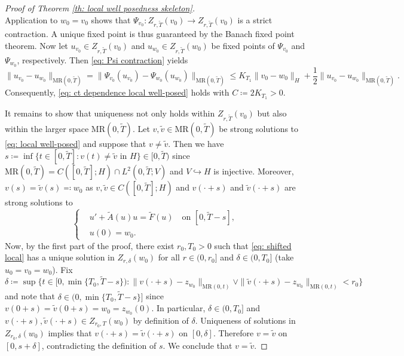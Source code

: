 \documentclass{amsart}
\renewcommand{\MR}{\mathrm{MR}}
\newcommand{\<}{\langle}
\newcommand{\?}{\rangle}
\newcommand{\into}{\hookrightarrow}
\theoremstyle{plain}
\theoremstyle{remark}
\theoremstyle{plain}
\numberwithin{equation}{section}
\begin{document}
\begin{proof}[Proof of Theorem \ref{th: local well posedness skeleton}]
\begin{equation}
\end{equation} 
Application to $w_0=v_0$ shows that $\Psi_{v_0}\colon Z_{r,\tilde{T}}(v_0)\to Z_{r,\tilde{T}}(v_0)$ is a strict contraction. A unique fixed point is thus guaranteed by the Banach fixed point theorem.
Now let $u_{v_0}\in Z_{r,\tilde{T}}(v_0)$ and $u_{w_0}\in Z_{r,\tilde{T}}(w_0)$ be fixed points of $\Psi_{v_0}$ and $\Psi_{w_0}$, respectively. Then \eqref{eq: Psi contraction} yields
\[
\|u_{v_0}-u_{w_0}\|_{\MR(0,\tilde{T})}=\|\Psi_{v_0}(u_{v_0})-\Psi_{w_0}(u_{w_0})\|_{\MR(0,\tilde{T})}\leq K_{T_1}\|v_0-w_0\|_H+\frac{1}{2}\|u_{v_0}-u_{w_0}\|_{\MR(0,\tilde{T})}.
\]
Consequently, \eqref{eq: ct dependence local well-posed} holds with $C\coloneqq 2K_{T_1}>0$.

It remains to show that uniqueness not only holds within $Z_{r,\tilde{T}}(v_0)$ but also within the larger space $\MR(0,\tilde{T})$.
Let $v,\tilde{v}\in \MR(0,\tilde{T})$ be strong solutions to \eqref{eq: local well-posed} and suppose that $v\neq \tilde{v}$. Then we have $s\coloneqq \inf\{t\in[0,\tilde{T}]:v(t)\neq \tilde{v} \text{ in } H\} \in[0,\tilde{T})$ since $\MR(0,\tilde{T})=C([0,\tilde{T}];H)\cap L^2(0,\tilde{T};V)$ and $V\into H$ is injective.  Moreover, $v(s)=\tilde{v}(s)\eqqcolon w_0$ as $v,\tilde{v}\in C([0,\tilde{T}];H)$ and $v(\cdot+s)$ and $\tilde{v}(\cdot+s)$ are strong solutions to
\begin{equation}\label{eq: shifted local}
\begin{cases}
    &u'+\tilde{A}(u)u=\tilde{F}(u) \quad\text{on } [0,\tilde{T}-s],\\
    &u(0)=w_0.
\end{cases}
\end{equation}
Now, by the first part of the proof, there exist $r_0,T_0>0$ such that \eqref{eq: shifted local} has a unique solution in $Z_{r,\delta}(w_0)$ for all $r\in(0,r_0]$ and $\delta\in(0,T_0]$ (take $u_0=v_0=w_0$).
Fix
\[
\delta\coloneqq \sup\{t\in[0,\min\{T_0,\tilde{T}-s\}):\|v(\cdot+s)-z_{w_0}\|_{\MR(0,t)}\vee\|\tilde{v}(\cdot+s)-z_{w_0}\|_{\MR(0,t)}<r_0\}
\]
and note that $\delta\in (0,\min\{T_0,\tilde{T}-s\}]$ since $v(0+s)=\tilde{v}(0+s)=w_0=z_{w_0}(0)$.
In particular, $\delta\in(0,T_0]$ and $v(\cdot+s),\tilde{v}(\cdot+s)\in Z_{r_0,T}(w_0)$ by definition of $\delta$.
Uniqueness of solutions in $Z_{r_0,\delta}(w_0)$ implies that $v(\cdot+s)=\tilde{v}(\cdot+s)$ on $[0,\delta]$.
Therefore $v=\tilde{v}$ on $[0,s+\delta]$, contradicting the definition of $s$.
We conclude that $v=\tilde{v}$.
\end{proof}
\end{document}
